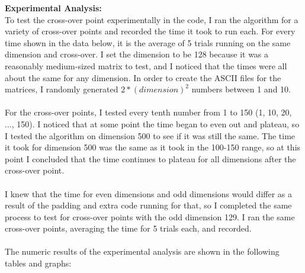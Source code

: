 \documentclass[11pt]{article}
\begin{document}
\textbf{Experimental Analysis:} \\
To test the cross-over point experimentally in the code, I ran the algorithm for a variety of cross-over points and recorded the time it took to run each. For every time shown in the data below, it is the average of 5 trials running on the same dimension and cross-over. I set the dimension to be 128 because it was a reasonably medium-sized matrix to test, and I noticed that the times were all about the same for any dimension. In order to create the ASCII files for the matrices, I randomly generated $2*(dimension)^2$ numbers between 1 and 10. \\\\
For the cross-over points, I tested every tenth number from 1 to 150 (1, 10, 20, ..., 150). I noticed that at some point the time began to even out and plateau, so I tested the algorithm on dimension 500 to see if it was still the same. The time it took for dimension 500 was the same as it took in the 100-150 range, so at this point I concluded that the time continues to plateau for all dimensions after the cross-over point. \\\\
I knew that the time for even dimensions and odd dimensions would differ as a result of the padding and extra code running for that, so I completed the same process to test for cross-over points with the odd dimension 129. I ran the same cross-over points, averaging the time for 5 trials each, and recorded. \\\\
The numeric results of the experimental analysis are shown in the following tables and graphs: \\\\\\\\\\\\\\\\\\\\
\end{document}
